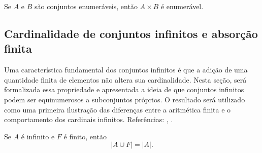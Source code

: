 \begin{proposicao}
    \label{prop:produto_cartesiano_enumeravel}
    Se \(A\) e \(B\) são conjuntos enumeráveis, então \(A\times B\) é enumerável.
\end{proposicao}

\subsection{Cardinalidade de conjuntos infinitos e absorção finita}
\label{subsec:absorcao_finita}

Uma característica fundamental dos conjuntos infinitos é que a adição de uma quantidade finita de elementos não altera sua cardinalidade. Nesta seção, será formalizada essa propriedade e apresentada a ideia de que conjuntos infinitos podem ser equinumerosos a subconjuntos próprios. O resultado será utilizado como uma primeira ilustração das diferenças entre a aritmética finita e o comportamento dos cardinais infinitos. Referências: \cite{halmos2014},
\cite{enderton1977}.

\begin{proposicao}
    \label{prop:absorcao_finito_infinito}
    Se \(A\) é infinito e \(F\) é finito, então
    \[
        |A\cup F|=|A|.
    \]
\end{proposicao}